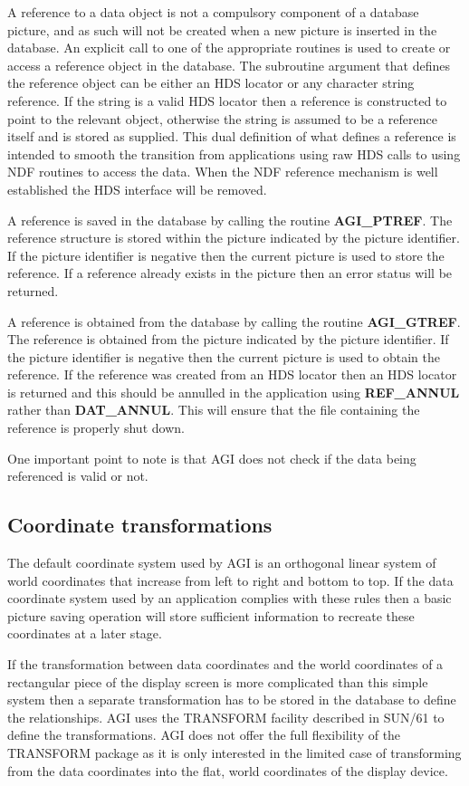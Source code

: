 A reference to a data object is not a compulsory component of a database
picture, and as such will not be created when a new picture is inserted
in the database.
An explicit call to one of the appropriate routines is used
to create or access a reference object in the database.
The subroutine argument that defines the reference object can be either
an HDS locator or any character string reference. If the string is a
valid HDS locator then a reference is constructed to point to the
relevant object, otherwise the string is assumed to be a reference
itself and is stored as supplied. This dual definition of what defines
a reference is intended to smooth the transition from applications
using raw HDS calls to using NDF routines to access the data. When the
NDF reference mechanism is well established the HDS interface will be
removed.

A reference is saved in the database by calling the routine
{\bf AGI\_PTREF}. The reference
structure is stored within the picture indicated by the picture
identifier. If the picture identifier is negative then the current
picture is used to store the reference. If a reference already exists
in the picture then an error status will be returned.

A reference is obtained from the database by calling the routine
{\bf AGI\_GTREF}. The reference is obtained from the picture indicated
by the picture identifier. If the picture identifier is negative then
the current picture is used to obtain the reference.
If the reference was created from an HDS locator then an HDS locator
is returned and this should be annulled in the application using
{\bf REF\_ANNUL} rather than {\bf DAT\_ANNUL}. This will ensure that
the file containing the reference is properly shut down.

One important point to note is that AGI does not check if the data being
referenced is valid or not.

\subsection{Coordinate transformations}\label{tran}
The default coordinate system used by AGI is an orthogonal linear
system of world coordinates that increase from left to right and
bottom to top. If the data coordinate system used by an application
complies with these rules then a basic picture saving operation
will store sufficient information to recreate these coordinates at a
later stage.

If the transformation between data coordinates and the world coordinates
of a rectangular piece of the display screen is more complicated than
this simple system then a separate transformation has to be stored in
the database to define the relationships.
AGI uses the TRANSFORM facility described in SUN/61 to define the
transformations. AGI does not offer the full flexibility of the TRANSFORM
package as it is only interested in the limited case of transforming
from the data coordinates into the flat, world coordinates of the display
device.

